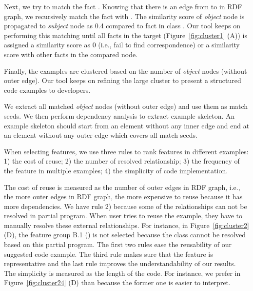  Next, we try to match the fact   . Knowing that there is an edge from  to  in RDF graph, we recursively match the fact   with  . The similarity score of {\it object} node  is propagated to {\it subject} node  as 0.4 compared to fact   in class .  Our tool keeps on performing this matching until all facts in the target (Figure~\ref{fig:cluster1} (A)) is assigned a similarity score as 0 (i.e., fail to find correspondence) or a similarity score with other facts in the compared node. 

Finally, the examples are clustered based on the number of  {\it object} nodes (without outer edge).  Our tool keeps on refining the large cluster to present a structured code examples to developers. 


  We extract all matched {\it object} nodes (without outer edge) and use them as  match seeds. We then perform dependency analysis to  extract example skeleton.  An example skeleton should start from an element without any inner edge and end at an element without any outer edge which covers all match seeds. 

When selecting features, we use three rules to rank features in different examples: 1) the cost of reuse; 2) the number of resolved relationship; 3) the frequency of the feature in multiple examples; 4) the simplicity of code implementation. 

The cost of reuse is measured as the number of outer edges in RDF graph, i.e., the more outer edges in RDF graph, the more expensive to reuse because it has more dependencies. We have rule 2) because  some of the relationships can not be resolved in partial program. When user tries to reuse the example, they have to manually resolve these external relationships. For instance, in Figure~\ref{fig:cluster2} (D), the feature group B.1 () is not selected because the class  cannot be resolved based on this partial program. The first two rules ease the reusability of our suggested code example. The third rule makes sure that the feature is representative and the last rule improves the understandability of our results. The simplicity is measured as the length of the code. For instance, we prefer  in Figure~\ref{fig:cluster24} (D) than  because the former one is easier to interpret. 

